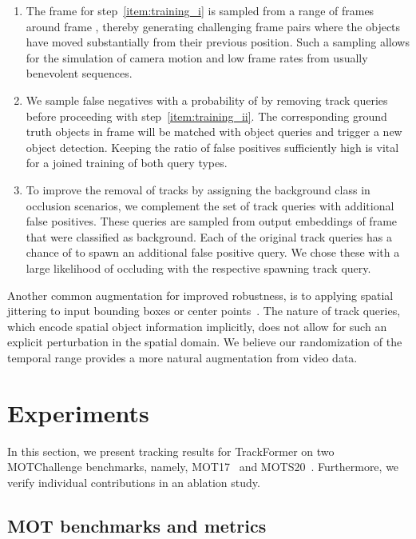 \documentclass[10pt,twocolumn,letterpaper]{article}
\begin{document}
\begin{enumerate}
    \item
        The frame  for step~\ref{item:training_i} is sampled from a range of frames around frame , thereby generating challenging frame pairs where the objects have moved substantially from their previous position.
Such a sampling allows for the simulation of camera motion and low frame rates from usually benevolent sequences. \label{item:temporal_stride}

    \item
        We sample false negatives with a probability of  by removing track queries before proceeding with step~\ref{item:training_ii}.
The corresponding ground truth objects in frame  will be matched with object queries and trigger a new object detection.
Keeping the ratio of false positives sufficiently high is vital for a joined training of both query types.


    \item
        To improve the removal of tracks by assigning the background class in occlusion scenarios, we complement the set of track queries with additional false positives.
These queries are sampled from output embeddings of frame  that were classified as background.
Each of the original track queries has a chance of  to spawn an additional false positive query.
We chose these with a large likelihood of occluding with the respective spawning track query.
\end{enumerate}

Another common augmentation for improved robustness, is to applying spatial jittering to input bounding boxes or center points~\cite{center_track}.
The nature of track queries, which encode spatial object information implicitly, does not allow for such an explicit perturbation in the spatial domain.
We believe our randomization of the temporal range provides a more natural augmentation from video data.
 \section{Experiments}

In this section, we present tracking results for TrackFormer on two MOTChallenge benchmarks, namely, MOT17~\cite{mot17} and MOTS20~\cite{MOTS}.
Furthermore, we verify individual contributions in an ablation study.

\subsection{MOT benchmarks and metrics}
\end{document}

